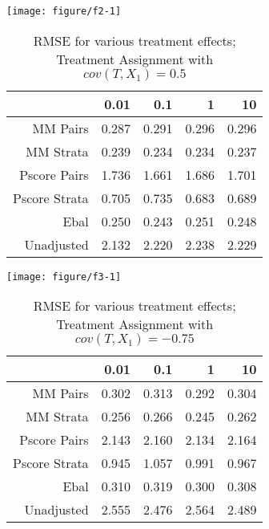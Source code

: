 \documentclass[11pt]{article}\usepackage[]{graphicx}\usepackage[]{color}
\makeatletter
\def\maxwidth{ %
  \ifdim\Gin@nat@width>\linewidth
    \linewidth
  \else
    \Gin@nat@width
  \fi
}
\newenvironment{knitrout}{}{} %
\makeatother
\begin{document}
\begin{knitrout}
\color{fgcolor}

{\centering \texttt{[image: figure/f2-1]} 

}



\end{knitrout}
\begin{table}[ht]
\centering
\begin{tabular}{rrrrr}
  \hline
 & 0.01 & 0.1 & 1 & 10 \\ 
  \hline
MM Pairs & 0.287 & 0.291 & 0.296 & 0.296 \\ 
  MM Strata & 0.239 & 0.234 & 0.234 & 0.237 \\ 
  Pscore Pairs & 1.736 & 1.661 & 1.686 & 1.701 \\ 
  Pscore Strata & 0.705 & 0.735 & 0.683 & 0.689 \\ 
  Ebal & 0.250 & 0.243 & 0.251 & 0.248 \\ 
  Unadjusted & 2.132 & 2.220 & 2.238 & 2.229 \\ 
   \hline
\end{tabular}
\caption{RMSE for various treatment effects; Treatment Assignment with $cov(T, X_1) = 0.5$} 
\label{tab:f2}
\end{table}


\begin{knitrout}
\color{fgcolor}

{\centering \texttt{[image: figure/f3-1]} 

}



\end{knitrout}
\begin{table}[ht]
\centering
\begin{tabular}{rrrrr}
  \hline
 & 0.01 & 0.1 & 1 & 10 \\ 
  \hline
MM Pairs & 0.302 & 0.313 & 0.292 & 0.304 \\ 
  MM Strata & 0.256 & 0.266 & 0.245 & 0.262 \\ 
  Pscore Pairs & 2.143 & 2.160 & 2.134 & 2.164 \\ 
  Pscore Strata & 0.945 & 1.057 & 0.991 & 0.967 \\ 
  Ebal & 0.310 & 0.319 & 0.300 & 0.308 \\ 
  Unadjusted & 2.555 & 2.476 & 2.564 & 2.489 \\ 
   \hline
\end{tabular}
\caption{RMSE for various treatment effects; Treatment Assignment with $cov(T, X_1) = -0.75$} 
\label{tab:f3}
\end{table}
\end{document}
